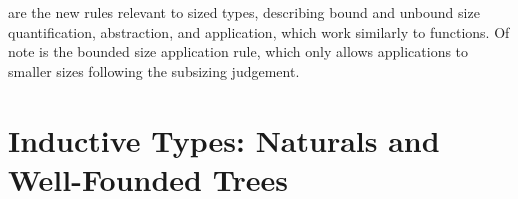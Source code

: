 \clearpage %
 are the new rules relevant to sized types,
describing bound and unbound size quantification, abstraction, and application,
which work similarly to functions.
Of note is the bounded size application rule,
which only allows applications to smaller sizes following the subsizing judgement.

\iffalse
Lastly are \rref{eq, refl, J} for propositional equality.
The constructor $\refl{e}$ is a reflexive proof of $\eq{e}{\tau}{e}$,
that $e$ of type $\tau$ is equal to itself.
Given some equality proof $p$ of $\eq{e_1}{\tau}{e_2}$
and a motive\index{motive} $P$ taking some $y$ of type $\tau$ and a proof that $\eq{e_1}{\tau}{y}$,
the $\J*$ eliminator is a proof of $\app{P}{e_2}{p}$ when provided a proof of $\app{P}{e_1}{\refl{e_1}}$.
Other usual functions on proofs of equality can be derived from it,
such as coercion (when the motive is a constant function on types in its first argument)
or substitution (when the motive ignores the second argument).
$\J*$ is only well typed when fully applied;
it can be manually uncurried for a specific universe $U$ as the function
\marginnote{The type annotation for the equality type and argument to $\refl{}$ may be omitted when evident from context.}
$$\fun{\tau}{U}{\fun{e_1}{\tau}{\fun{e_2}{\tau}{\fun{P}{(\funtype{y}{\tau}{\funtype{z}{\eq{e_1}{}{y}}{U}})}{\fun{d}{\app{P}{e_1}{\refl{}}}{\fun{p}{\eq{e_1}{}{e_2}}{\J{P}{d}{p}}}}}}},$$
and similarly for $\refl{}$.
\fi

\section{Inductive Types: Naturals and Well-Founded Trees}\label{sec:ind-types}

